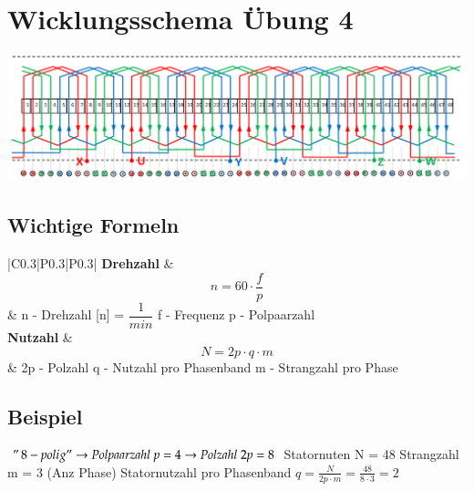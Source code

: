 \section{Wicklungsschema Übung 4}
\includegraphics[scale = 0.5]{images/Wicklungsschema}
\subsection{Wichtige Formeln}
    \renewcommand{\arraystretch}{1}
\begin{tabular}{|C{0.3\textwidth}|P{0.3\textwidth}|P{0.3\textwidth}|}
	\hline
	\textbf{Drehzahl} &
    \[n = 60\cdot \dfrac{f}{p}\] &
    \vspace{0.1cm}n - Drehzahl [n] = $\dfrac{1}{min}$ \newline 
    f - Frequenz \newline
    p - Polpaarzahl 
    \\ \hline
	\textbf{Nutzahl} &
    \[ N = 2p\cdot q\cdot m\] &
    2p - Polzahl \newline 
    q - Nutzahl pro Phasenband \newline
    m - Strangzahl pro Phase 
    \\ \hline						 
\end{tabular}

\subsection{Beispiel}
\begin{center}
    \begin{minipage}{0.5\linewidth}	
        $ "\,8-polig "  \rightarrow  Polpaarzahl \; p = 4   \rightarrow  Polzahl \;2p = 8$\newline
        Statornuten N = 48  \newline
        Strangzahl m = 3 (Anz Phase)\newline
        Statornutzahl pro Phasenband $q = \frac{N}{2p \cdot m}= \frac{48}{8 \cdot 3}=2 $\newline
    \end{minipage}\newline
\end{center}

